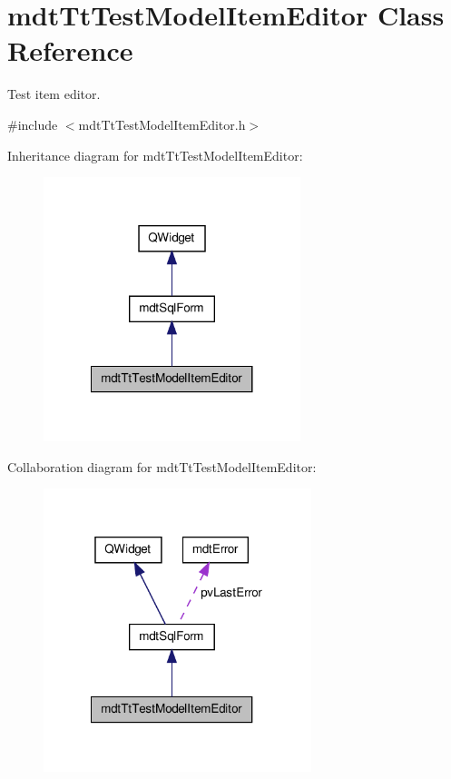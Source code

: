 \hypertarget{classmdt_tt_test_model_item_editor}{\section{mdt\-Tt\-Test\-Model\-Item\-Editor Class Reference}
\label{classmdt_tt_test_model_item_editor}
}


Test item editor.  




{\ttfamily \#include $<$mdt\-Tt\-Test\-Model\-Item\-Editor.\-h$>$}



Inheritance diagram for mdt\-Tt\-Test\-Model\-Item\-Editor\-:
\nopagebreak
\begin{figure}[H]
\begin{center}
\leavevmode
\includegraphics[width=212pt]{classmdt_tt_test_model_item_editor__inherit__graph}
\end{center}
\end{figure}


Collaboration diagram for mdt\-Tt\-Test\-Model\-Item\-Editor\-:
\nopagebreak
\begin{figure}[H]
\begin{center}
\leavevmode
\includegraphics[width=221pt]{classmdt_tt_test_model_item_editor__coll__graph}
\end{center}
\end{figure}
